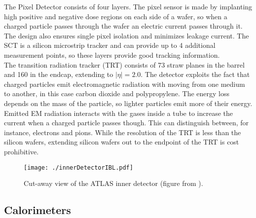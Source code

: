 The Pixel Detector consists of four layers.  The pixel sensor is made by implanting high positive and negative dose regions on each side of a wafer, so when a charged particle passes through the wafer an electric current passes through it.  The design also ensures single pixel isolation and minimizes leakage current.  The SCT is a silicon microstrip tracker and can provide up to 4 additional measurement points, so these layers provide good tracking information.  \\%

The transition radiation tracker (TRT) consists of 73 straw planes in the barrel and 160 in the endcap, extending to $|\eta|=2.0$.  The detector exploits the fact that charged particles emit electromagnetic radiation with moving from one medium to another, in this case carbon dioxide and polypropylene.  The energy loss depends on the mass of the particle, so lighter particles emit more of their energy.  Emitted EM radiation interacts with the gases inside a tube to increase the current when a charged particle passes though.  This can distinguish between, for instance, electrons and pions.  While the resolution of the TRT is less than the silicon wafers, extending silicon wafers out to the endpoint of the TRT is cost prohibitive.  \\

\begin{figure}[h!]
  \centering
	\texttt{[image: ./innerDetectorIBL.pdf]}
\caption[Cut-away view of the ATLAS inner detector]{\label{fig:innerDetector}{ Cut-away view of the ATLAS inner detector (figure from \cite{IBL}). }} %
\end{figure}

\subsection{Calorimeters}  \label{sec:calorimeters}%

